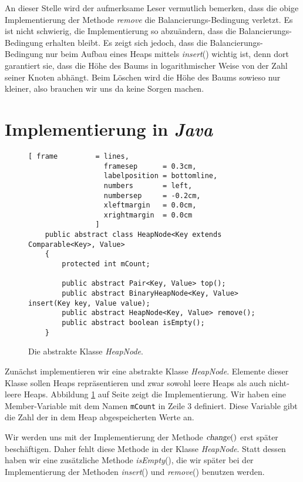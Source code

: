An dieser Stelle wird der aufmerksame Leser vermutlich bemerken, dass die obige
Implementierung der Methode \textsl{remove} die Balancierungs-Bedingung verletzt.
Es ist nicht schwierig, die Implementierung so abzu\"andern, dass die
Balancierungs-Bedingung erhalten bleibt. Es zeigt sich jedoch, dass die
Balancierungs-Bedingung  nur beim Aufbau eines Heaps mittels \textsl{insert}() wichtig ist,
denn dort garantiert sie, dass die H\"ohe des Baums in logarithmischer Weise von der Zahl
seiner Knoten abh\"angt.  Beim L\"oschen wird die H\"ohe des Baums sowieso nur kleiner, also
brauchen wir uns da keine Sorgen machen.

\section{Implementierung in \textsl{Java}}

\begin{figure}[!h]
  \centering
\begin{Verbatim}[ frame         = lines, 
                  framesep      = 0.3cm, 
                  labelposition = bottomline,
                  numbers       = left,
                  numbersep     = -0.2cm,
                  xleftmargin   = 0.0cm,
                  xrightmargin  = 0.0cm
                ]
    public abstract class HeapNode<Key extends Comparable<Key>, Value>
    {
        protected int mCount;
    
        public abstract Pair<Key, Value> top();
        public abstract BinaryHeapNode<Key, Value> insert(Key key, Value value);
        public abstract HeapNode<Key, Value> remove();    
        public abstract boolean isEmpty();
    }
\end{Verbatim}
\vspace*{-0.3cm}
  \caption{Die abstrakte Klasse \textsl{HeapNode}.}
  \label{fig:HeapNode}
\end{figure}
Zun\"achst implementieren wir eine abstrakte Klasse \textsl{HeapNode}.  Elemente dieser
Klasse sollen Heaps repr\"asentieren und zwar sowohl leere Heaps als auch nicht-leere Heaps.
Abbildung \ref{fig:HeapNode} auf Seite \pageref{fig:HeapNode} zeigt die Implementierung.
Wir haben eine Member-Variable mit dem Namen \texttt{mCount} in Zeile 3 definiert.
Diese Variable gibt die Zahl der in dem Heap abgespeicherten Werte an.

Wir werden uns mit der Implementierung der Methode $\textsl{change}()$ erst sp\"ater
besch\"aftigen. Daher fehlt diese Methode in der Klasse \textsl{HeapNode}.
Statt dessen haben wir eine zus\"atzliche Methode \textsl{isEmpty}(), die wir sp\"ater bei der
Implementierung der Methoden \textsl{insert}() und \textsl{remove}() benutzen werden.

